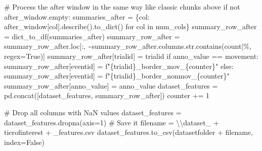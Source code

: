 \documentclass[
  letterpaper,
  DIV=11,
  numbers=noendperiod]{scrreprt}
\newenvironment{Shaded}{\begin{snugshade}}{\end{snugshade}}
\newcommand{\BuiltInTok}[1]{\textcolor[rgb]{0.00,0.23,0.31}{#1}}
\newcommand{\CharTok}[1]{\textcolor[rgb]{0.13,0.47,0.30}{#1}}
\newcommand{\CommentTok}[1]{\textcolor[rgb]{0.37,0.37,0.37}{#1}}
\newcommand{\ControlFlowTok}[1]{\textcolor[rgb]{0.00,0.23,0.31}{#1}}
\newcommand{\DecValTok}[1]{\textcolor[rgb]{0.68,0.00,0.00}{#1}}
\newcommand{\KeywordTok}[1]{\textcolor[rgb]{0.00,0.23,0.31}{#1}}
\newcommand{\NormalTok}[1]{\textcolor[rgb]{0.00,0.23,0.31}{#1}}
\newcommand{\OperatorTok}[1]{\textcolor[rgb]{0.37,0.37,0.37}{#1}}
\newcommand{\SpecialCharTok}[1]{\textcolor[rgb]{0.37,0.37,0.37}{#1}}
\newcommand{\SpecialStringTok}[1]{\textcolor[rgb]{0.13,0.47,0.30}{#1}}
\newcommand{\StringTok}[1]{\textcolor[rgb]{0.13,0.47,0.30}{#1}}
\newcommand{\VariableTok}[1]{\textcolor[rgb]{0.07,0.07,0.07}{#1}}
\begin{document}
\begin{Shaded}
\begin{Highlighting}[]
            \CommentTok{\# Process the \textquotesingle{}after\textquotesingle{} window in the same way like classic chunks above}
            \ControlFlowTok{if} \KeywordTok{not}\NormalTok{ after\_window.empty:}
\NormalTok{                summaries\_after }\OperatorTok{=}\NormalTok{ \{col: after\_window[col].describe().to\_dict() }\ControlFlowTok{for}\NormalTok{ col }\KeywordTok{in}\NormalTok{ num\_cols\}}
\NormalTok{                summary\_row\_after }\OperatorTok{=}\NormalTok{ dict\_to\_df(summaries\_after)}
\NormalTok{                summary\_row\_after }\OperatorTok{=}\NormalTok{ summary\_row\_after.loc[:, }\OperatorTok{\textasciitilde{}}\NormalTok{summary\_row\_after.columns.}\BuiltInTok{str}\NormalTok{.contains(}\StringTok{\textquotesingle{}count|\%\textquotesingle{}}\NormalTok{, regex}\OperatorTok{=}\VariableTok{True}\NormalTok{)]}
\NormalTok{                summary\_row\_after[}\StringTok{\textquotesingle{}trialid\textquotesingle{}}\NormalTok{] }\OperatorTok{=}\NormalTok{ trialid}
                \ControlFlowTok{if}\NormalTok{ anno\_value }\OperatorTok{==} \StringTok{\textquotesingle{}movement\textquotesingle{}}\NormalTok{:}
\NormalTok{                    summary\_row\_after[}\StringTok{\textquotesingle{}eventid\textquotesingle{}}\NormalTok{] }\OperatorTok{=} \SpecialStringTok{f"}\SpecialCharTok{\{}\NormalTok{trialid}\SpecialCharTok{\}}\SpecialStringTok{\_border\_mov\_}\SpecialCharTok{\{}\NormalTok{counter}\SpecialCharTok{\}}\SpecialStringTok{"}
                \ControlFlowTok{else}\NormalTok{:}
\NormalTok{                    summary\_row\_after[}\StringTok{\textquotesingle{}eventid\textquotesingle{}}\NormalTok{] }\OperatorTok{=} \SpecialStringTok{f"}\SpecialCharTok{\{}\NormalTok{trialid}\SpecialCharTok{\}}\SpecialStringTok{\_border\_nonmov\_}\SpecialCharTok{\{}\NormalTok{counter}\SpecialCharTok{\}}\SpecialStringTok{"}
\NormalTok{                summary\_row\_after[}\StringTok{\textquotesingle{}anno\_value\textquotesingle{}}\NormalTok{] }\OperatorTok{=}\NormalTok{ anno\_value}
\NormalTok{                dataset\_features }\OperatorTok{=}\NormalTok{ pd.concat([dataset\_features, summary\_row\_after])}
\NormalTok{                counter }\OperatorTok{+=} \DecValTok{1}

    \CommentTok{\# Drop all columns with NaN values}
\NormalTok{    dataset\_features }\OperatorTok{=}\NormalTok{ dataset\_features.dropna(axis}\OperatorTok{=}\DecValTok{1}\NormalTok{)}
    \CommentTok{\# Save it}
\NormalTok{    filename }\OperatorTok{=} \StringTok{\textquotesingle{}}\CharTok{\textbackslash{}\textbackslash{}}\StringTok{dataset\_\textquotesingle{}} \OperatorTok{+}\NormalTok{ tierofinterest }\OperatorTok{+} \StringTok{\textquotesingle{}\_features.csv\textquotesingle{}}
\NormalTok{    dataset\_features.to\_csv(datasetfolder }\OperatorTok{+}\NormalTok{ filename, index}\OperatorTok{=}\VariableTok{False}\NormalTok{)}
\end{Highlighting}
\end{Shaded}
\end{document}
